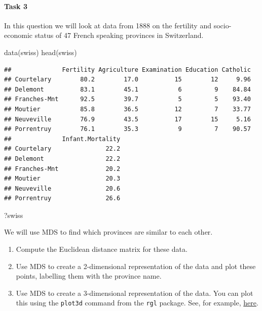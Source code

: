 \documentclass[
]{book}
\newenvironment{Shaded}{\begin{snugshade}}{\end{snugshade}}
\newcommand{\FunctionTok}[1]{\textcolor[rgb]{0.00,0.00,0.00}{#1}}
\newcommand{\NormalTok}[1]{#1}
\theoremstyle{definition}
\theoremstyle{definition}
\theoremstyle{definition}
\theoremstyle{definition}
\theoremstyle{remark}
\begin{document}
\hypertarget{task-3-1}{%
\paragraph*{Task 3}\label{task-3-1}}

In this question we will look at data from 1888 on the fertility and socio-economic status of 47 French speaking provinces in Switzerland.

\begin{Shaded}
\begin{Highlighting}[]
\FunctionTok{data}\NormalTok{(swiss)}
\FunctionTok{head}\NormalTok{(swiss)}
\end{Highlighting}
\end{Shaded}

\begin{verbatim}
##              Fertility Agriculture Examination Education Catholic
## Courtelary        80.2        17.0          15        12     9.96
## Delemont          83.1        45.1           6         9    84.84
## Franches-Mnt      92.5        39.7           5         5    93.40
## Moutier           85.8        36.5          12         7    33.77
## Neuveville        76.9        43.5          17        15     5.16
## Porrentruy        76.1        35.3           9         7    90.57
##              Infant.Mortality
## Courtelary               22.2
## Delemont                 22.2
## Franches-Mnt             20.2
## Moutier                  20.3
## Neuveville               20.6
## Porrentruy               26.6
\end{verbatim}

\begin{Shaded}
\begin{Highlighting}[]
\NormalTok{?swiss}
\end{Highlighting}
\end{Shaded}

We will use MDS to find which provinces are similar to each other.

\begin{enumerate}
\def\labelenumi{\roman{enumi}.}
\item
  Compute the Euclidean distance matrix for these data.
\item
  Use MDS to create a 2-dimensional representation of the data and plot these points, labelling them with the province name.
\item
  Use MDS to create a 3-dimensional representation of the data. You can plot this using the \texttt{plot3d} command from the \texttt{rgl} package. See, for example, \href{https://rpubs.com/aagarwal29/179912}{here}.
\end{enumerate}
\end{document}
